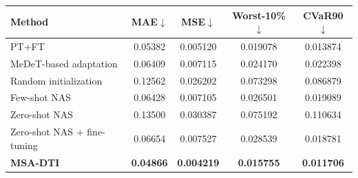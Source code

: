 \begin{center}
\begin{minipage}{\linewidth}
\label{tab:overall}
\centering
\footnotesize
\renewcommand{\arraystretch}{1.08}
\setlength{\tabcolsep}{4.0pt}
\begin{tabular*}{\linewidth}{@{\extracolsep{\fill}}lcccc@{}}
\toprule
Method & MAE$\downarrow$ & MSE$\downarrow$ & Worst-10\%$\downarrow$ & CVaR90$\downarrow$ \\
\midrule
PT+FT & 0.05382 & 0.005120 & 0.019078 & 0.013874 \\
MeDeT-based adaptation & 0.06409 & 0.007115 & 0.024170 & 0.022398 \\
Random initialization & 0.12562 & 0.026202 & 0.073298 & 0.086879 \\
Few-shot NAS & 0.06428 & 0.007105 & 0.026501 & 0.019089 \\
Zero-shot NAS & 0.13500 & 0.030387 & 0.075192 & 0.110634 \\
Zero-shot NAS + fine-tuning & 0.06654 & 0.007527 & 0.028539 & 0.018781 \\
\textbf{MSA-DTI} & \textbf{0.04866} & \textbf{0.004219} &
\textbf{0.015755} & \textbf{0.011706} \\
\bottomrule
\end{tabular*}
\end{minipage}
\end{center}
